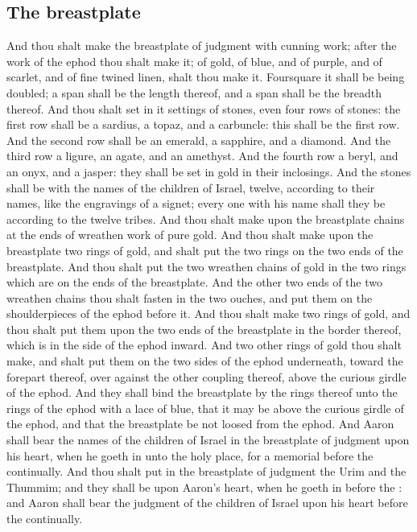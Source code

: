 \begin{biblechapter}
\section*{The breastplate}
\verse And thou shalt make the breastplate of judgment with cunning work; after the work of the ephod thou shalt make it; of gold, of blue, and of purple, and of scarlet, and of fine twined linen, shalt thou make it.
\verse Foursquare it shall be being doubled; a span shall be the length thereof, and a span shall be the breadth thereof.
\verse And thou shalt set in it settings of stones, even four rows of stones: the first row shall be a sardius, a topaz, and a carbuncle: this shall be the first row.
\verse And the second row shall be an emerald, a sapphire, and a diamond.
\verse And the third row a ligure, an agate, and an amethyst.
\verse And the fourth row a beryl, and an onyx, and a jasper: they shall be set in gold in their inclosings.
\verse And the stones shall be with the names of the children of Israel, twelve, according to their names, like the engravings of a signet; every one with his name shall they be according to the twelve tribes.
\verse And thou shalt make upon the breastplate chains at the ends of wreathen work of pure gold.
\verse And thou shalt make upon the breastplate two rings of gold, and shalt put the two rings on the two ends of the breastplate.
\verse And thou shalt put the two wreathen chains of gold in the two rings which are on the ends of the breastplate.
\verse And the other two ends of the two wreathen chains thou shalt fasten in the two ouches, and put them on the shoulderpieces of the ephod before it.
\verse And thou shalt make two rings of gold, and thou shalt put them upon the two ends of the breastplate in the border thereof, which is in the side of the ephod inward.
\verse And two other rings of gold thou shalt make, and shalt put them on the two sides of the ephod underneath, toward the forepart thereof, over against the other coupling thereof, above the curious girdle of the ephod.
\verse And they shall bind the breastplate by the rings thereof unto the rings of the ephod with a lace of blue, that it may be above the curious girdle of the ephod, and that the breastplate be not loosed from the ephod.
\verse And Aaron shall bear the names of the children of Israel in the breastplate of judgment upon his heart, when he goeth in unto the holy place, for a memorial before the \LORD continually.
\verse And thou shalt put in the breastplate of judgment the Urim and the Thummim; and they shall be upon Aaron's heart, when he goeth in before the \LORD: and Aaron shall bear the judgment of the children of Israel upon his heart before the \LORD continually.
\columnbreak %

\end{biblechapter}
